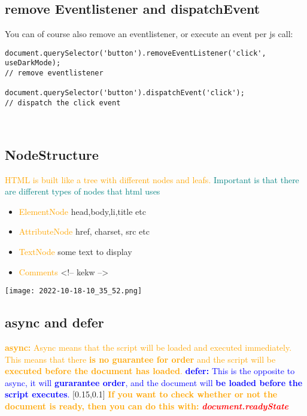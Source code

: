 \documentclass[main.tex,fontsize=6pt,paper=a4,paper=landscape,DIV=calc,]{scrartcl}
\begin{document}
\begin{multicols*}{4}
\subsection{remove Eventlistener and dispatchEvent}  
You can of course also remove an eventlistener, or execute an event per js call:
\begin{lstlisting}
document.querySelector('button').removeEventListener('click', useDarkMode);
// remove eventlistener

document.querySelector('button').dispatchEvent('click');
// dispatch the click event
\end{lstlisting}
\, \newline

\subsection{NodeStructure}  
\textcolor{orange}{HTML is built like a tree with different nodes and leafs.}\newline
\textcolor{teal}{Important is that there are different types of nodes that html uses}
\begin{itemize}
  \item \textcolor{orange}{ElementNode} head,body,li,title etc
  \item \textcolor{orange}{AttributeNode} href, charset, src etc
  \item \textcolor{orange}{TextNode} some text to display
  \item \textcolor{orange}{Comments} <!-- kekw -->
\end{itemize}
\texttt{[image: 2022-10-18-10\_35\_52.png]}

\subsection{async and defer}  
\textcolor{orange}{\textbf{async:} Async means that the script will be loaded and executed immediately.\newline
This means that there \textbf{is no guarantee for order} and the script will be \textbf{executed before the document has loaded}.}\newline
\textcolor{blue}{\textbf{defer:} This is the opposite to async, it will \textbf{gurarantee order}, \newline
and the document will \textbf{be loaded before the script executes}.}\newline
{}[0.15,0.1]
\textcolor{orange}{\textbf{If you want to check whether or not the document is ready, \newline
then you can do this with: }}\textcolor{red}{\textbf{\emph{document.readyState}}}



\end{multicols*}
\end{document}
